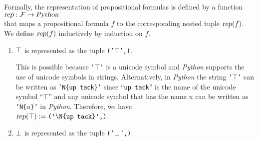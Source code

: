 Formally, the representation of propositional formulas is defined by a function 
\\[0.2cm]
\hspace*{1.3cm}
$\textsl{rep}: \mathcal{F} \rightarrow \textsl{Python}$
\\[0.2cm]
that maps a propositional formula $f$ to the corresponding nested tuple 
$\textsl{rep}(f)$.  We define $\textsl{rep}(f)$ inductively by induction on $f$.
\begin{enumerate}
\item $\top$ is represented as the tuple \texttt{('$\top$',)}.
  
      This is possible because \texttt{'$\top$'} is a unicode symbol and \textsl{Python} supports the use of unicode
      symbols in strings.   Alternatively, in \textsl{Python} the string \texttt{'$\top$'} can be written as
      \texttt{'N\{up tack\}'} since ``\texttt{up tack}'' is the name of the unicode symbol
      ``$\top$'' and any unicode symbol that has the name  $u$ can be written 
      as \texttt{'N\{$u$\}'} in \textsl{Python}.  Therefore, we have
      \\[0.2cm]
      \hspace*{1.3cm}
      $\textsl{rep}(\verum) := \texttt{('\symbol{92}N\{up tack\}',)}$.
\item $\bot$  is represented as the tuple \texttt{('$\bot$',)}.
      

\end{enumerate}
